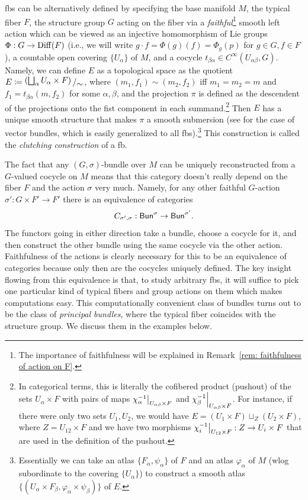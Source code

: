 \begin{defn}\label{def bundle construction}
    \Glspl{fb} can be alternatively defined by specifying the base manifold $M$, the typical fiber $F$, the structure group $G$ acting on the fiber via a \emph{faithful}\footnote{The importance of faithfulness will be explained in Remark~\ref{rem: faithfulness of action on F}.} smooth left action which can be viewed as an injective homomorphism of Lie groups $\Phi:G\to \operatorname{Diff}(F)$ (i.e., we will write $g\cdot f=\Phi(g)(f)=\Phi_g(p)$ for $g\in G, f\in F$), a countable open covering $\{U_\alpha\}$ of $M$, and a cocycle  $t_{\beta\alpha}\in C^\infty (U_{\alpha\beta}, G)$. Namely, we can define $E$ as a topological space as the quotient $E\coloneqq \bigslant{(\bigsqcup_\alpha U_\alpha \times F)}{\sim}$, where $(m_1,f_1)\sim(m_2,f_2)$ iff $m_1=m_2=m$ and $f_1=t_{\beta\alpha}(m,f_2)$ for some $\alpha,\beta$, and the projection $\pi$ is defined as the descendent of the projections onto the fist component in each summand.\footnote{In categorical terms, this is literally the cofibered product (pushout) of the sets $U_\alpha \times F$ with pairs of maps $\restr{\chi_\alpha^{-1}}{U_{\alpha\beta}\times F}$ and $\restr{\chi_\beta^{-1}}{U_{\alpha\beta}\times F}$. For instance, if there were only two sets $U_1,U_2$, we would have $E=(U_1\times F)\sqcup_Z (U_2\times F)$, where $Z=U_{12}\times F$ and we have two morphisms $\restr{\chi_i^{-1}}{U_{12}\times F}:Z\to U_i\times F$ that are used in the definition of the pushout.}
    Then $E$ has a unique smooth structure that makes $\pi$ a smooth submersion (see \cite[Lem.~10.6]{Lee} for the case of vector bundles, which is easily generalized to all \glspl{fb}).\footnote{Essentially we can take an atlas $\{F_\alpha,\psi_\alpha\}$ of $F$ and an atlas $\varphi_\alpha$ of $M$ (\gls{wlog} subordinate to the covering $\{U_\alpha\}$) to construct a smooth atlas $\{(U_\alpha\times F_\beta,\varphi_\alpha\times\psi_\beta)\}$ of $E$.} This construction is called the \emph{clutching construction} of a \gls{fb}.
\end{defn}


The fact that any $(G,\sigma)$-bundle over $M$ can be uniquely reconstructed from a $G$-valued cocycle on $M$ means that this category doesn't really depend on the fiber $F$ and the action $\sigma$ very much. Namely, for any other faithful $G$-action $\sigma':G\times F'\to F'$ there is an equivalence of categories
\[C_{\sigma',\sigma}:\mathsf{Bun}^\sigma\to \mathsf{Bun}^{\sigma'}.\label{eq equivalence of bundle categories}\]
The functors going in either direction take a bundle, choose a cocycle for it, and then construct the other bundle using the same cocycle via the other action. Faithfulness of the actions is clearly necessary for this to be an equivalence of categories because only then are the cocycles uniquely defined. The key insight flowing from this equivalence is that, to study arbitrary \glspl{fb}, it will suffice to pick one particular kind of typical fibers and group actions on them which makes computations easy. This computationally convenient class of bundles turns out to be the class of \emph{principal bundles}, where the typical fiber coincides with the structure group. We discuss them in the examples below.



